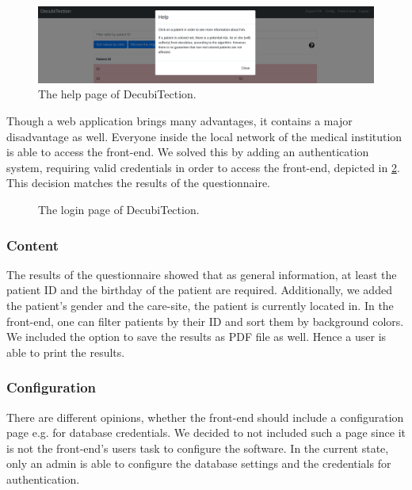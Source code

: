 \begin{figure}[htp]
    \centering
    \includegraphics[width=15cm]{images/help.png}
    \caption{The help page of DecubiTection.}
    \label{fig:help}
\end{figure}

Though a web application brings many advantages, it contains a major disadvantage as well. 
Everyone inside the local network of the medical institution is able to access the front-end. 
We solved this by adding an authentication system, requiring valid credentials in order to access the front-end, depicted in \ref{fig:login}.
This decision matches the results of the questionnaire. 

\begin{figure}[htp]
    \centering
    \caption{The login page of DecubiTection.}
    \label{fig:login}
\end{figure}

\subsubsection{Content}
The results of the questionnaire showed that as general information, at least the patient ID and the birthday of the patient are required. 
Additionally, we added the patient's gender and the care-site, the patient is currently located in. 
In the front-end, one can filter patients by their ID and sort them by background colors. 
We included the option to save the results as PDF file as well. 
Hence a user is able to print the results. 

\subsubsection{Configuration}
There are different opinions, whether the front-end should include a configuration page e.g. for database credentials. 
We decided to not included such a page since it is not the front-end's users task to configure the software. 
In the current state, only an admin is able to configure the database settings and the credentials for authentication. 

